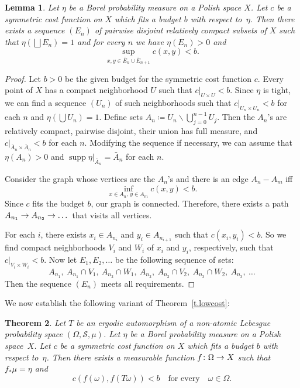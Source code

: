 \documentclass[10pt]{amsart}
\newtheorem{theo}{Theorem}[section]
\newtheorem{lemm}[theo]{Lemma}\newtheorem{prop}[theo]{Proposition}\newtheorem{coro}[theo]{Corollary}\newtheorem{conj}[theo]{Conjecture}
\theoremstyle{definition}\newtheorem{defi}[theo]{Definition}\newtheorem{rema}[theo]{Remark}\newtheorem{exam}[theo]{Example}\newtheorem{exem}[theo]{Example}\newtheorem{nota}[theo]{Notation}
\DeclareMathOperator{\supp}{supp}
\newcommand{\clS}{\mathcal{S}}
\renewcommand{\setminus}{\smallsetminus}
\renewcommand*{\to}{\mathchoice{\longrightarrow}{\rightarrow}{\rightarrow}{\rightarrow}}
\begin{document}
\begin{lemm}\label{l.March}
Let $\eta$ be a Borel probability measure on a Polish space $X$. Let $c$ be a symmetric cost function on $X$ which fits a budget $b$ with respect to~$\eta$. Then there exists a sequence $(E_n)$ of pairwise disjoint relatively compact subsets of $X$ such that $\eta(\bigsqcup E_n) = 1$ and for every $n$ we have $\eta(E_n)>0$ and
\begin{equation}
\sup_{x,y \in \bar{E}_n \cup \bar{E}_{n+1}} c(x,y) < b.
\end{equation}
\end{lemm}

\begin{proof}
Let $b>0$ be the given budget for the symmetric cost function $c$. Every point of $X$ has a compact neighborhood $U$ such that $c|_{U \times U} < b$. Since $\eta$ is tight, we can find a sequence $(U_n)$ of such neighborhoods such that $c|_{U_n \times U_n} < b$ for each $n$ and $\eta(\bigcup U_n) = 1$. Define sets $A_n \coloneqq U_n \setminus \bigcup_{j=0}^{n-1} U_j$. Then the $A_n$'s are relatively compact, pairwise disjoint, their union has full measure, and $c|_{\bar{A}_n \times \bar{A}_n} < b$ for each $n$. Modifying the sequence if necessary, we can assume that $\eta(A_n)>0$ and $\supp \eta|_{\bar{A}_n} = \bar{A}_n$ for each $n$.


Consider the graph whose vertices are the $A_n$'s and there is an edge $A_n - A_m$ iff
\begin{equation}
\inf_{x \in A_n, \, y \in A_m} c(x,y) < b.
\end{equation}
Since $c$ fits the budget $b$, our graph is connected. Therefore, there exists a path $A_{n_1} \to A_{n_2} \to \dots$ that visits all vertices.

For each $i$, there exists $x_i \in A_{n_i}$ and $y_i \in A_{n_{i+1}}$ such that $c(x_i,y_i) < b$. So we find compact neighborhoods $V_i$ and $W_i$ of $x_i$ and $y_i$, respectively, such that $c|_{V_i \times W_i} < b$. Now let $E_1,E_2,\dots$ be the following sequence of sets:
\begin{equation}
A_{n_1}, \ A_{n_1} \cap V_1, \ A_{n_2} \cap W_1, \ A_{n_2}, \ A_{n_2} \cap V_2, \ A_{n_3} \cap W_2, \ A_{n_3}, \ \dots
\end{equation}
Then the sequence $(E_n)$ meets all requirements.
\end{proof}

We now establish the following variant of Theorem~\ref{t.lowcost}:

\begin{theo}\label{t.boundedcost}
Let $T$ be an ergodic automorphism of a non-atomic Lebesgue probability space $(\Omega,\clS,\mu)$. Let $\eta$ be a Borel probability measure on a Polish space~$X$. Let $c$ be a symmetric cost function on $X$ which fits a budget $b$ with respect to~$\eta$. Then there exists a measurable function $f \colon \Omega \to X$ such that $f_* \mu = \eta$ and
\begin{equation}
c(f(\omega),f(T \omega)) < b \quad\text{for every}\quad \omega \in \Omega.
\end{equation}
\end{theo}
\end{document}
